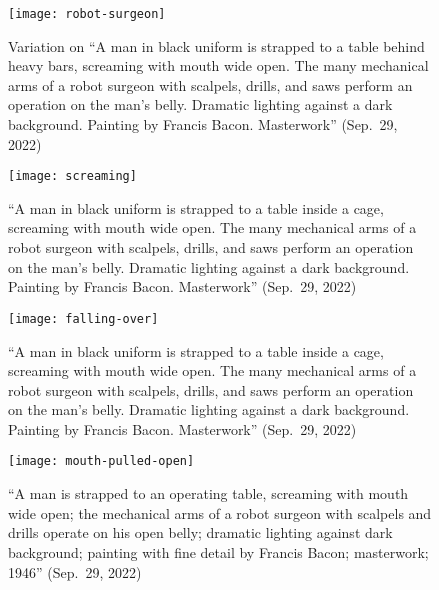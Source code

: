 \begin{figure}[t]
\centering
\begin{minipage}[t]{0.49\textwidth}
    \centering
    \texttt{[image: robot-surgeon]}
    \caption{Variation on ``A man in black uniform is strapped to a table behind
        heavy bars, screaming with mouth wide open. The many mechanical arms of
        a robot surgeon with scalpels, drills, and saws perform an operation on
        the man's belly. Dramatic lighting against a dark background. Painting
        by Francis Bacon. Masterwork'' (Sep.\ 29, 2022)}
\end{minipage}
\hfill
\begin{minipage}[t]{0.49\textwidth}
    \centering
    \texttt{[image: screaming]}
    \caption{``A man in black uniform is strapped to a table inside a cage,
        screaming with mouth wide open. The many mechanical arms of a robot
        surgeon with scalpels, drills, and saws perform an operation on the
        man's belly. Dramatic lighting against a dark background. Painting by
        Francis Bacon. Masterwork'' (Sep.\ 29, 2022)}
\end{minipage}
\end{figure}

\begin{figure}[t]
\begin{minipage}[t]{0.49\textwidth}
    \centering
    \texttt{[image: falling-over]}
    \caption{``A man in black uniform is strapped to a table inside a cage,
        screaming with mouth wide open. The many mechanical arms of a robot
        surgeon with scalpels, drills, and saws perform an operation on the
        man's belly. Dramatic lighting against a dark background. Painting by
        Francis Bacon. Masterwork'' (Sep.\ 29, 2022)}
\end{minipage}
\hfill
\begin{minipage}[t]{0.49\textwidth}
    \centering
    \texttt{[image: mouth-pulled-open]}
    \caption{``A man is strapped to an operating table, screaming with mouth
        wide open; the mechanical arms of a robot surgeon with scalpels and
        drills operate on his open belly; dramatic lighting against dark
        background; painting with fine detail by Francis Bacon; masterwork;
        1946'' (Sep.\ 29, 2022)}
\end{minipage}
\end{figure}

